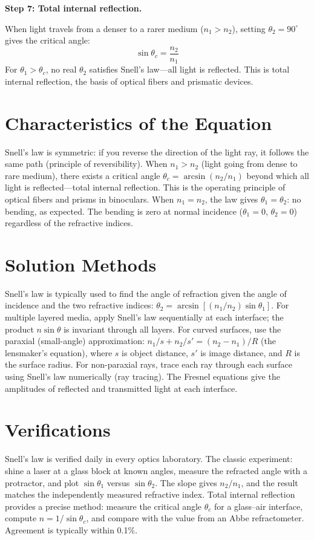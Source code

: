 \textbf{Step 7: Total internal reflection.}

When light travels from a denser to a rarer medium ($n_1 > n_2$), setting $\theta_2 = 90^\circ$ gives the critical angle:
\begin{equation}
\sin\theta_c = \frac{n_2}{n_1}
\end{equation}
For $\theta_1 > \theta_c$, no real $\theta_2$ satisfies Snell's law---all light is reflected. This is total internal reflection, the basis of optical fibers and prismatic devices.

\section*{Characteristics of the Equation}

Snell's law is symmetric: if you reverse the direction of the light ray, it follows the same path (principle of reversibility). When $n_1 > n_2$ (light going from dense to rare medium), there exists a critical angle $\theta_c = \arcsin(n_2/n_1)$ beyond which all light is reflected---total internal reflection. This is the operating principle of optical fibers and prisms in binoculars. When $n_1 = n_2$, the law gives $\theta_1 = \theta_2$: no bending, as expected. The bending is zero at normal incidence ($\theta_1 = 0$, $\theta_2 = 0$) regardless of the refractive indices.
\section*{Solution Methods}

Snell's law is typically used to find the angle of refraction given the angle of incidence and the two refractive indices: $\theta_2 = \arcsin[(n_1/n_2)\sin\theta_1]$. For multiple layered media, apply Snell's law sequentially at each interface; the product $n\sin\theta$ is invariant through all layers. For curved surfaces, use the paraxial (small-angle) approximation: $n_1/s + n_2/s' = (n_2 - n_1)/R$ (the lensmaker's equation), where $s$ is object distance, $s'$ is image distance, and $R$ is the surface radius. For non-paraxial rays, trace each ray through each surface using Snell's law numerically (ray tracing). The Fresnel equations give the amplitudes of reflected and transmitted light at each interface.
\section*{Verifications}

Snell's law is verified daily in every optics laboratory. The classic experiment: shine a laser at a glass block at known angles, measure the refracted angle with a protractor, and plot $\sin\theta_1$ versus $\sin\theta_2$. The slope gives $n_2/n_1$, and the result matches the independently measured refractive index. Total internal reflection provides a precise method: measure the critical angle $\theta_c$ for a glass--air interface, compute $n = 1/\sin\theta_c$, and compare with the value from an Abbe refractometer. Agreement is typically within 0.1\%.
